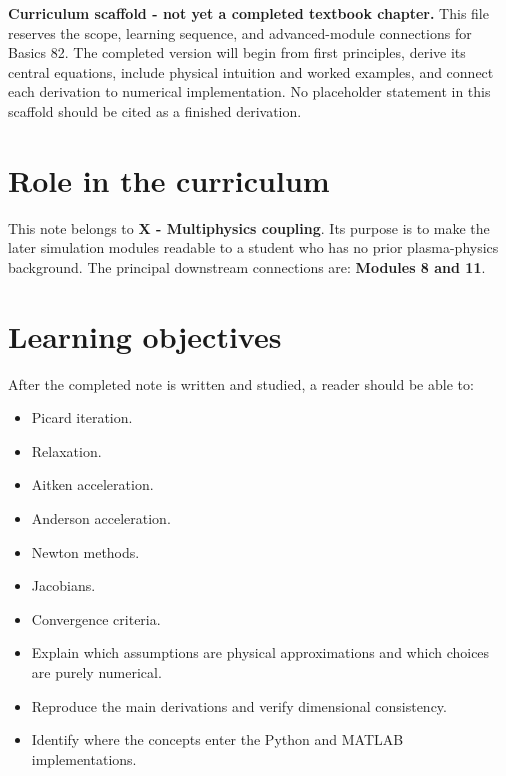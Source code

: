 \documentclass[11pt]{article}
\begin{document}

\begin{overviewbox}
\textbf{Curriculum scaffold - not yet a completed textbook chapter.} This file reserves the scope, learning sequence, and advanced-module connections for Basics 82. The completed version will begin from first principles, derive its central equations, include physical intuition and worked examples, and connect each derivation to numerical implementation. No placeholder statement in this scaffold should be cited as a finished derivation.
\end{overviewbox}

\ProjectTOC

\section{Role in the curriculum}
This note belongs to \textbf{X - Multiphysics coupling}. Its purpose is to make the later simulation modules readable to a student who has no prior plasma-physics background. The principal downstream connections are: \textbf{Modules 8 and 11}.

\section{Learning objectives}
After the completed note is written and studied, a reader should be able to:
\begin{itemize}[leftmargin=1.6em]
\item Picard iteration.
\item Relaxation.
\item Aitken acceleration.
\item Anderson acceleration.
\item Newton methods.
\item Jacobians.
\item Convergence criteria.
\item Explain which assumptions are physical approximations and which choices are purely numerical.
\item Reproduce the main derivations and verify dimensional consistency.
\item Identify where the concepts enter the Python and MATLAB implementations.
\end{itemize}
\end{document}
